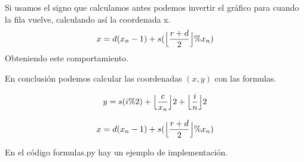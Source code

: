 \documentclass{article}
\begin{document}
\vspace{0.5cm}

Si usamos el signo que calculamos antes podemos invertir el gráfico para cuando la fila 
vuelve, calculando así la coordenada x.
\begin{equation*}
    x = d(x_n-1)+s ( \Bigl\lfloor \frac{r+d}{2} \Bigr\rfloor \% x_n )
\end{equation*}
Obteniendo este comportamiento.

\begin{figure}[h]
\end{figure}

\newpage

En conclusión podemos calcular las coordenadas $(x, y)$ con las formulas.

\begin{equation*}
    y = s(i\%2) +
	 \Bigl\lfloor \frac{c}{x_n} \Bigr\rfloor 2 +
	 \Bigl\lfloor \frac{i}{n} \Bigr\rfloor 2
\end{equation*}

\begin{equation*}
    x = d(x_n-1)+s ( \Bigl\lfloor \frac{r+d}{2} \Bigr\rfloor \% x_n )
\end{equation*}

En el código formulas.py hay un ejemplo de implementación.
\end{document}
